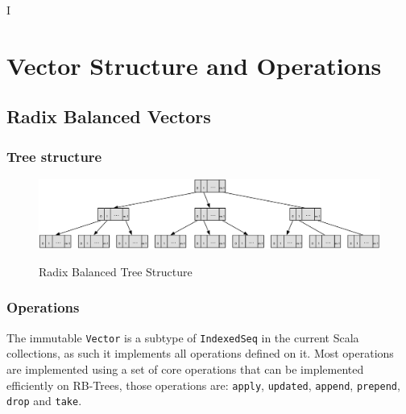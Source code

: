 I%

\chapter{Vector Structure and Operations} %

\label{VectorStructure} %



\section{Radix Balanced Vectors}


\subsection{Tree structure}


\begin{figure}[h!]
  \centering
  \includegraphics[width=\textwidth]{Figures/Radix_Balanced}
  \label{badix_balanced}
  \caption{Radix Balanced Tree Structure}
\end{figure}



\subsection{Operations}
The immutable \texttt{Vector} \cite{scalaVector211} is a subtype of \texttt{IndexedSeq} in the current Scala collections, as such it implements all operations defined on it. Most operations are implemented using a set of core operations that can be implemented efficiently on RB-Trees, those operations are: \texttt{apply}, \texttt{updated}, \texttt{append}, \texttt{prepend}, \texttt{drop} and \texttt{take}. 

